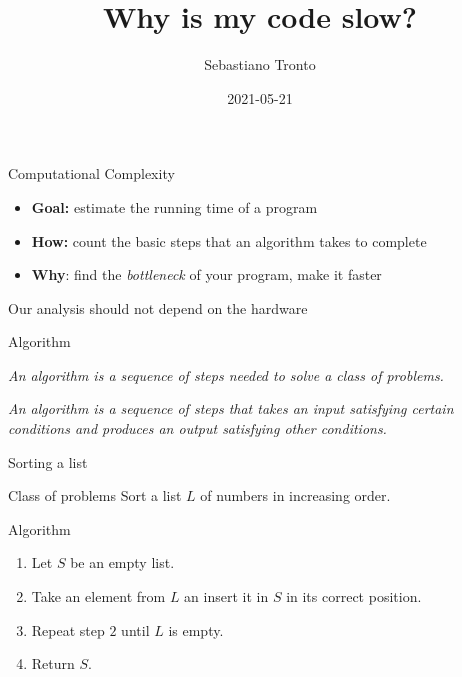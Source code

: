 \documentclass[11pt]{beamer}
\author[\texttt{sebastiano.tronto@uni.lu}]{Sebastiano Tronto}
\title[Computational Complexity]%
{Why is my code slow?}
\date{2021-05-21}
\begin{document}
\begin{frame}
  \titlepage
\end{frame}

\begin{frame}{Computational Complexity}
	\begin{itemize}
		\item \textbf{Goal:}
		      estimate the running {\color{blue}time} of a program
		\item \textbf{How:}
		      count the {\color{blue}basic steps} that an
		      {\color{blue}algorithm} takes to complete
		\item \textbf{Why}:
		      find the \emph{bottleneck} of your program, make it faster
	\end{itemize}

	\vspace{0.5cm}
	Our analysis should not depend on the hardware
\end{frame}

\begin{frame}{Algorithm}
	\begin{definition}
		\emph{An algorithm is a sequence of {\color{blue}steps} needed to
		solve a {\color{blue}class of problems}. }
	\end{definition}

	\begin{definition}[alternative]
		\emph{An algorithm is a sequence of steps that takes
		an input satisfying certain conditions and produces an output
		satisfying other conditions.}
	\end{definition}
\end{frame}

\begin{frame}{Sorting a list}
	\begin{block}{Class of problems}
		Sort a list $L$ of numbers in increasing order.
	\end{block}

	\begin{block}{Algorithm}
		\begin{enumerate}
			\item Let $S$ be an empty list.
			\item Take an element from $L$ an insert it in $S$ in its correct
			      position.
			\item Repeat step $2$ until $L$ is empty.
			\item Return $S$.
		\end{enumerate}
	\end{block}
\end{frame}
\end{document}
